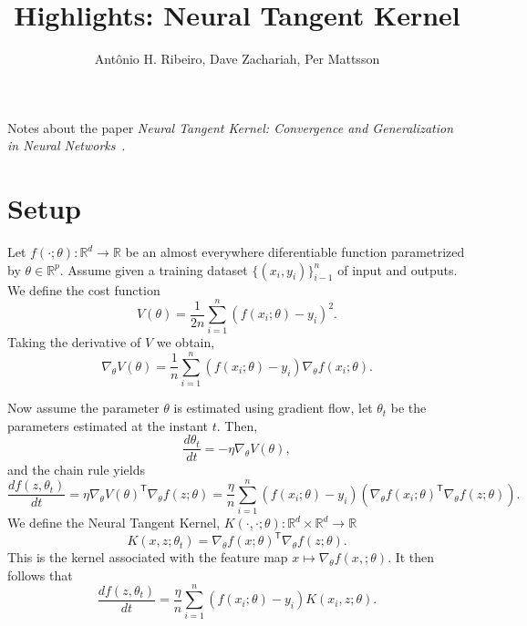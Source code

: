 \documentclass[a4paper,10pt]{article}
\title{Highlights: Neural Tangent Kernel}
\author{Antônio H. Ribeiro, Dave Zachariah, Per Mattsson}
\date{}
\newcommand{\R}{\mathbb{R}}
\newcommand{\trnsp}{\mathsf{T}}
\begin{document}
\maketitle

Notes about the paper \textit{Neural Tangent Kernel: Convergence and Generalization in Neural Networks}~\citep{jacot_neural_2018}.


\section{Setup}

Let $f(\cdot; \theta): \R^d  \rightarrow \R$ be an almost everywhere diferentiable function  parametrized by $\theta\in \R^p$. Assume given a training dataset $\{(x_i, y_i)\}_{i-1}^n$ of input and outputs. We define the cost function
\begin{equation}
    V(\theta) = \frac{1}{2n} \sum_{i = 1}^n (f(x_i; \theta) - y_i)^2.
\end{equation}
Taking the derivative of $V$ we obtain,
\begin{equation}
    \nabla_\theta V(\theta) = \frac{1}{n} \sum_{i = 1}^n (f(x_i; \theta) - y_i) \nabla_\theta f(x_i; \theta).
\end{equation}

Now assume the parameter $\theta$ is estimated using gradient flow, let $\theta_t$ be the parameters estimated at the instant $t$. Then,
\begin{equation}
     \frac{d \theta_t}{d t}= - \eta \nabla_\theta V(\theta),
\end{equation}
and the chain rule yields
\begin{equation}
    \frac{d f(z, \theta_t)}{d t} = \eta \nabla_\theta V(\theta)^\trnsp \nabla_\theta f(z; \theta) =  \frac{\eta}{n} \sum_{i = 1}^n  (f(x_i; \theta) - y_i) \left( \nabla_\theta f(x_i; \theta)^\trnsp \nabla_\theta f(z; \theta)\right).
\end{equation}
We define the Neural Tangent Kernel, $K(\cdot, \cdot; \theta): \R^d \times \R^d  \rightarrow \R$
\begin{equation}
    K(x, z; \theta_t) = \nabla_\theta f(x; \theta)^\trnsp \nabla_\theta f(z; \theta).
\end{equation}
This is the kernel associated with the feature map $x \mapsto \nabla_\theta f(x,; \theta)$.  It then follows that
\begin{equation}
  \label{eq:training_ode}
    \frac{d f(z, \theta_t)}{d t} = \frac{\eta}{n} \sum_{i = 1}^n  (f(x_i; \theta) - y_i) K(x_i, z; \theta).
\end{equation}
\end{document}
